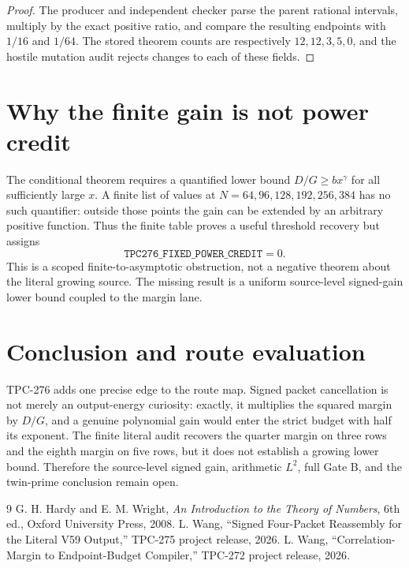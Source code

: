 \documentclass[11pt]{article}
\newcommand{\Dpack}{D}
\newcommand{\Gpack}{G}
\begin{document}
\begin{proof}
The producer and independent checker parse the parent rational intervals,
multiply by the exact positive ratio, and compare the resulting endpoints with
\(1/16\) and \(1/64\).  The stored theorem counts are respectively
\(12,12,3,5,0\), and the hostile mutation audit rejects changes to each of
these fields.\end{proof}

\section{Why the finite gain is not power credit}

The conditional theorem requires a quantified lower bound
\(\Dpack/\Gpack\geq b x^\gamma\) for all sufficiently large \(x\).  A finite
list of values at \(N=64,96,128,192,256,384\) has no such quantifier: outside
those points the gain can be extended by an arbitrary positive function.  Thus
the finite table proves a useful threshold recovery but assigns
\[
 \texttt{TPC276\_FIXED\_POWER\_CREDIT}=0.
\]
This is a scoped finite-to-asymptotic obstruction, not a negative theorem about
the literal growing source.  The missing result is a uniform source-level
signed-gain lower bound coupled to the margin lane.

\section{Conclusion and route evaluation}

TPC-276 adds one precise edge to the route map.  Signed packet cancellation is
not merely an output-energy curiosity: exactly, it multiplies the squared
margin by \(D/G\), and a genuine polynomial gain would enter the strict budget
with half its exponent.  The finite literal audit recovers the quarter margin
on three rows and the eighth margin on five rows, but it does not establish a
growing lower bound.  Therefore the source-level signed gain, arithmetic
\(L^2\), full Gate B, and the twin-prime conclusion remain open.

\begin{thebibliography}{9}
G. H. Hardy and E. M. Wright, \emph{An Introduction to the Theory of Numbers},
6th ed., Oxford University Press, 2008.
L. Wang, ``Signed Four-Packet Reassembly for the Literal V59 Output,''
TPC-275 project release, 2026.
L. Wang, ``Correlation-Margin to Endpoint-Budget Compiler,''
TPC-272 project release, 2026.
\end{thebibliography}
\end{document}
